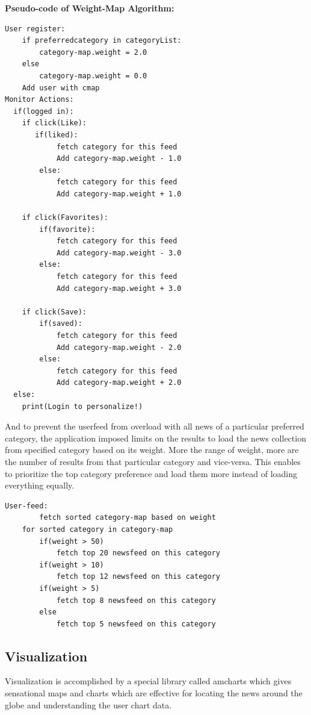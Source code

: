 \textbf{Pseudo-code of Weight-Map Algorithm:}
\begin{lstlisting}
User register: 
	if preferredcategory in categoryList:
		category-map.weight = 2.0
    else	
		category-map.weight = 0.0
    Add user with cmap
Monitor Actions:
  if(logged in):
	if click(Like): 
	   if(liked):
    		fetch category for this feed
		    Add category-map.weight - 1.0
        else:	
    		fetch category for this feed
    		Add category-map.weight + 1.0

	if click(Favorites): 
	    if(favorite):
    		fetch category for this feed
    		Add category-map.weight - 3.0
        else: 	
    		fetch category for this feed
    		Add category-map.weight + 3.0
	
	if click(Save): 
	    if(saved):
    		fetch category for this feed
    		Add category-map.weight - 2.0
        else: 	
    		fetch category for this feed
    		Add category-map.weight + 2.0
  else:
    print(Login to personalize!)
\end{lstlisting}

And to prevent the userfeed from overload with all news of a particular preferred category, the application imposed limits on the results to load the news collection from specified category based on its weight. More the range of weight, more are the number of results from that particular category and vice-versa.
This enables to prioritize the top category preference and load them more instead of loading everything equally.

\begin{lstlisting}
User-feed:
     	fetch sorted category-map based on weight
	for sorted category in category-map
		if(weight > 50)
			fetch top 20 newsfeed on this category
 		if(weight > 10)
			fetch top 12 newsfeed on this category
		if(weight > 5)
			fetch top 8 newsfeed on this category
		else
			fetch top 5 newsfeed on this category

\end{lstlisting}

\subsection{Visualization}
Visualization is accomplished by a special library called amcharts which gives sensational maps and charts which are effective for locating the news around the globe and understanding the user chart data.

